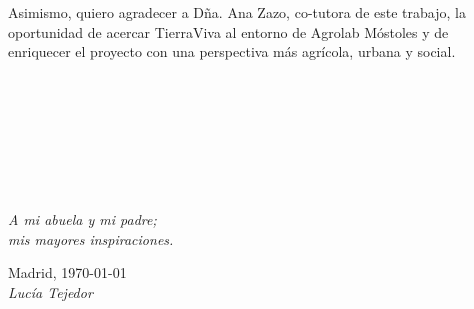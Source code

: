 Asimismo, quiero agradecer a Dña. Ana Zazo, co-tutora de este trabajo, la oportunidad de acercar TierraViva al entorno de Agrolab Móstoles y de enriquecer el proyecto con una perspectiva más agrícola, urbana y social.
\

\

\

\
\

\
\begin{flushright}
		\emph{A mi abuela y mi padre;\\
      mis mayores inspiraciones.}\\
		\par
		Madrid, \today\\ 
		\emph{Lucía Tejedor}
\end{flushright}

\thispagestyle{empty}

